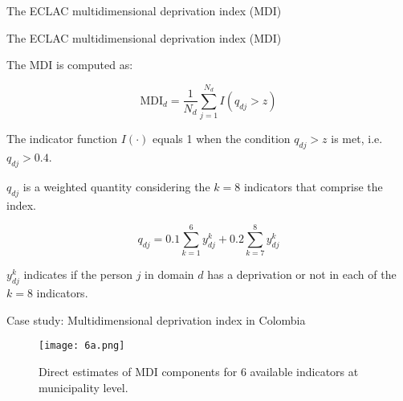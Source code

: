 \documentclass [xcolor=svgnames, t, 9pt] {beamer}
\begin{document}
\begin{frame}{The ECLAC multidimensional deprivation index (MDI)}
\begin{itemize}
\end{itemize} 

\end{frame}

\begin{frame}{The ECLAC multidimensional deprivation index (MDI)}
    \vspace{0.3cm}
    
The MDI is computed as: 

\begin{equation}
    \text{MDI}_d =\frac{1}{N_d} \sum^{N_d}_{j=1} I(q_{dj} > z)
\end{equation}

The indicator function $I(\cdot)$ equals 1 when the condition $q_{dj} > z$ is met, i.e. $q_{dj} > 0.4$. 

\vspace{0.3cm}

$q_{dj}$ is a weighted quantity considering the $k=8$ indicators that comprise the index. 

\vspace{0.3cm}
$$ q_{dj} = 0.1  \sum^{6}_{k=1} y_{dj}^k + 0.2 \sum^{8}_{k=7} y_{dj}^k$$

\vspace{0.3cm}

$y_{dj}^k$ indicates if the person $j$ in domain $d$ has a deprivation or not in each of the $k=8$ indicators. 

\end{frame}



\begin{frame}{Case study: Multidimensional deprivation index in Colombia}


\begin{figure}[htp]
    \centering
    \texttt{[image: 6a.png]}\hspace*{-1cm}
    \caption{Direct estimates of MDI components for 6 available indicators at municipality level.}
\end{figure}


\end{frame}
\end{document}
